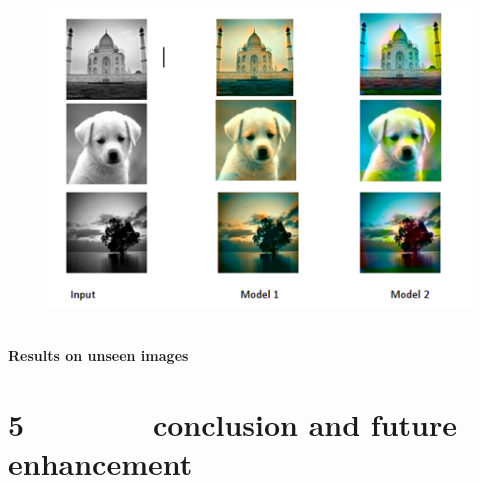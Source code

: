 \documentclass[12pt]{article}
\begin{document}
\vspace{\baselineskip}



\begin{figure}[H]
	\begin{Center}
		\includegraphics[width=4.96in,height=3.53in]{./media/image14.png}
	\end{Center}
\end{figure}



\par

\begin{Center}
{\fontsize{14pt}{16.8pt}\selectfont \textbf{Results on unseen images}\par}
\end{Center}\par

\begin{Center}
 
\end{Center}\par

\begin{Center}
 
\end{Center}\par

\section*{5\ \ \ \ \ \ \ \  conclusion and future enhancement}
\end{document}
